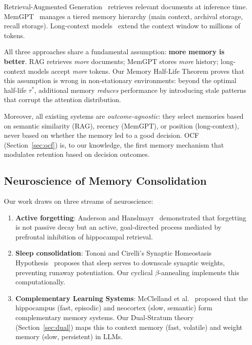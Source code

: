 \documentclass[11pt, a4paper]{article}
\begin{document}
Retrieval-Augmented Generation~\cite{lewis2020rag} retrieves relevant documents at inference time. MemGPT~\cite{peng2023memgpt} manages a tiered memory hierarchy (main context, archival storage, recall storage). Long-context models~\cite{liu2024lost} extend the context window to millions of tokens.

All three approaches share a fundamental assumption: \textbf{more memory is better}. RAG retrieves \emph{more} documents; MemGPT stores \emph{more} history; long-context models accept \emph{more} tokens. Our Memory Half-Life Theorem proves that this assumption is wrong in non-stationary environments: beyond the optimal half-life $\tau^*$, additional memory \emph{reduces} performance by introducing stale patterns that corrupt the attention distribution.

Moreover, all existing systems are \emph{outcome-agnostic}: they select memories based on semantic similarity (RAG), recency (MemGPT), or position (long-context), never based on whether the memory led to a good decision. OCF (Section~\ref{sec:ocf}) is, to our knowledge, the first memory mechanism that modulates retention based on decision outcomes.

\subsection{Neuroscience of Memory Consolidation}

Our work draws on three streams of neuroscience:
\begin{enumerate}[leftmargin=*]
  \item \textbf{Active forgetting}: Anderson and Hanslmayr~\cite{anderson2014} demonstrated that forgetting is not passive decay but an active, goal-directed process mediated by prefrontal inhibition of hippocampal retrieval.
  \item \textbf{Sleep consolidation}: Tononi and Cirelli's Synaptic Homeostasis Hypothesis~\cite{tononi2014sleep} proposes that sleep serves to downscale synaptic weights, preventing runaway potentiation. Our cyclical $\beta$-annealing implements this computationally.
  \item \textbf{Complementary Learning Systems}: McClelland et al.~\cite{mcclelland1995cls} proposed that the hippocampus (fast, episodic) and neocortex (slow, semantic) form complementary memory systems. Our Dual-Stratum theory (Section~\ref{sec:dual}) maps this to context memory (fast, volatile) and weight memory (slow, persistent) in LLMs.
\end{enumerate}
\end{document}
